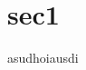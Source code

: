 \documentclass[12pt, a4paper]{article}
\begin{document}
	\section{sec1}
	asudhoiausdi
\end{document}
